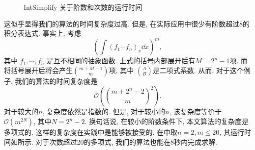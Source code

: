 \begin{figure}[htb]
\centering
{}
\caption{IntSimplify 关于阶数和次数的运行时间}
\end{figure}

这似乎显得我们的算法的时间复杂度过高. 但是, 在实际应用中很少有阶数超过8的积分表达式. 事实上, 考虑
\begin{equation}
\left(\int\!{(f_1\cdots f_n)_x\dd x}\right)^m,
\label{poly}
\end{equation}
其中 $f_1,\cdots,f_n$ 是互不相同的抽象函数. 上式的括号内部展开后有$M=2^n-1$项. 而将括号展开后将会产生$\binom{m+M-1}{m}$项, 其中 $\binom{A}{B}$是二项式系数. 从而, 对于这个例子, 我们的算法的时间复杂度是 
\begin{equation}
\mathcal O\left(\binom{m+2^n-2}{m}^2\right).
\label{polynomial_complexity}    
\end{equation}
对于较大的$n$, 复杂度依然是指数的. 但是, 对于较小的$n$, 该复杂度等价于
$\mathcal O(m^{2N})$, 其中$N=2^n-2$. 换句话说, 在较小的阶数条件下, 本文算法的复杂度是多项式的. 这样的复杂度在实践中是能够被接受的. 在中取$n=2,m\le 20$, 其运行时间如所示.
对于次数超过20的多项式, 我们的算法也能在8秒内完成求解. 

